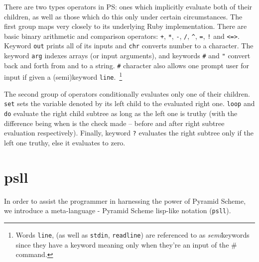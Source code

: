 \documentclass[aip,jcp,reprint,footinbib]{revtex4-1}
\let\tt\texttt
\newcommand\psll{\texttt{psll}\xspace}
\begin{document}
There are two types operators in PS: ones which implicitly evaluate both of their children, as well as those which do this only under certain circumstances. The first group maps very closely to its underlying Ruby implementation. There are basic binary arithmetic and comparison operators: \tt{+}, \tt{*}, \tt{-}, \tt{/}, \tt{\^}, \tt{=}, \tt{!} and \tt{<=>}. Keyword \tt{out} prints all of its inputs and \tt{chr} converts number to a character. The keyword \tt{arg} indexes arrays (or input arguments), and keywords \tt{\#} and \tt{"} convert back and forth from and to a string. \tt{\#} character also allows one prompt user for input if given a (semi)keyword \tt{line}.~\footnote{Words \tt{line}, (as well as \tt{stdin}, \tt{readline}) are referenced to as \emph{semi}keywords since they have a keyword meaning only when they're an input of the \# command.}~\cite{pyra_git}

The second group of operators conditionally evaluates only one of their children. \tt{set} sets the variable denoted by its left child to the evaluated right one. \tt{loop} and \tt{do} evaluate the right child subtree as long as the left one is truthy (with the difference being when is the check made -- before and after right subtree evaluation respectively). Finally, keyword \tt{?} evaluates the right subtree only if the left one truthy, else it evaluates to zero.

\section{psll}\label{sec:psll}

In order to assist the programmer in harnessing the power of Pyramid Scheme, we introduce a meta-language - Pyramid Scheme lisp-like notation (\psll).
\end{document}
